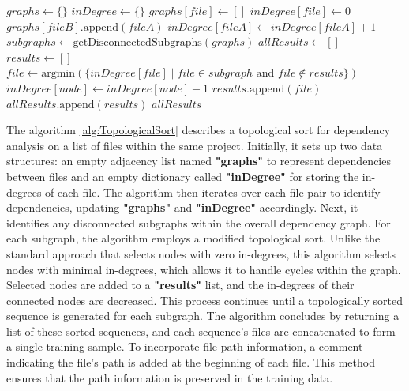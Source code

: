 \begin{algorithm}[!t]
\caption{Topological Sort for Dependency Analysis}
\label{alg:TopologicalSort}
\begin{algorithmic}[1]
    \State $graphs \gets \{\}$  
    \State $inDegree \gets \{\}$  
        \State $graphs[file] \gets []$ 
        \State $inDegree[file] \gets 0$ 
    \EndFor
    \State
             
                \State $graphs[fileB].\text{append}(fileA)$  
                \State $inDegree[fileA] \gets inDegree[fileA] + 1$  
            \EndIf
        \EndFor \EndFor \State \State $subgraphs \gets \text{getDisconnectedSubgraphs}(graphs)$ 
    \State $allResults \gets []$
        \State $results \gets []$
            \State $file \gets \text{argmin}(\{inDegree[file] \mid file \in subgraph \text{ and } file \notin results\})$
                \State $inDegree[node] \gets inDegree[node] - 1$
            \EndFor
            \State $results.\text{append}(file)$
        \EndWhile
        \State $allResults.\text{append}(results)$
    \EndFor
    \State \State \Return $allResults$
\EndProcedure
\end{algorithmic}
\end{algorithm}

The algorithm \ref{alg:TopologicalSort} describes a topological sort for dependency analysis on a list of files within the same project. Initially, it sets up two data structures: an empty adjacency list named \textbf{"graphs"} to represent dependencies between files and an empty dictionary called \textbf{"inDegree"} for storing the in-degrees of each file. The algorithm then iterates over each file pair to identify dependencies, updating \textbf{"graphs"} and \textbf{"inDegree"} accordingly. Next, it identifies any disconnected subgraphs within the overall dependency graph. For each subgraph, the algorithm employs a modified topological sort. Unlike the standard approach that selects nodes with zero in-degrees, this algorithm selects nodes with minimal in-degrees, which allows it to handle cycles within the graph. Selected nodes are added to a \textbf{"results"} list, and the in-degrees of their connected nodes are decreased. This process continues until a topologically sorted sequence is generated for each subgraph. The algorithm concludes by returning a list of these sorted sequences, and each sequence's files are concatenated to form a single training sample. To incorporate file path information, a comment indicating the file's path is added at the beginning of each file. This method ensures that the path information is preserved in the training data.

